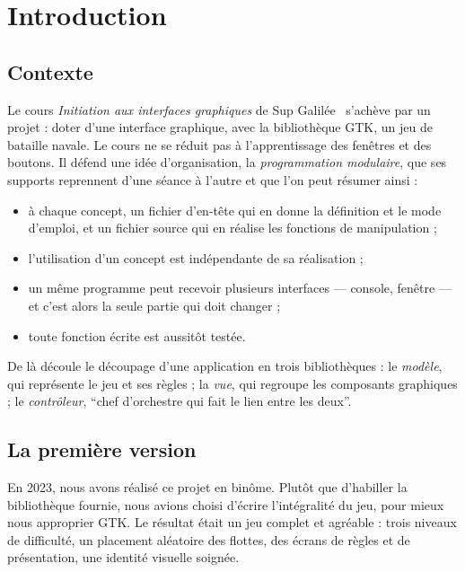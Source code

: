 \chapter{Introduction}
\label{chap-introduction}

\section{Contexte}

Le cours \emph{Initiation aux interfaces graphiques} de Sup Galilée~\cite{toulouse2023}
s'achève par un projet : doter d'une interface graphique, avec la bibliothèque GTK, un jeu
de bataille navale. Le cours ne se réduit pas à l'apprentissage des fenêtres et des boutons.
Il défend une idée d'organisation, la \emph{programmation modulaire}, que ses supports
reprennent d'une séance à l'autre et que l'on peut résumer ainsi :

\begin{itemize}
  \item à chaque concept, un fichier d'en-tête qui en donne la définition et le mode
        d'emploi, et un fichier source qui en réalise les fonctions de manipulation ;
  \item l'utilisation d'un concept est indépendante de sa réalisation ;
  \item un même programme peut recevoir plusieurs interfaces --- console, fenêtre --- et
        c'est alors la seule partie qui doit changer ;
  \item toute fonction écrite est aussitôt testée.
\end{itemize}

De là découle le découpage d'une application en trois bibliothèques : le \emph{modèle}, qui
représente le jeu et ses règles ; la \emph{vue}, qui regroupe les composants graphiques ;
le \emph{contrôleur}, \enquote{chef d'orchestre qui fait le lien entre les deux}.

\section{La première version}

En 2023, nous avons réalisé ce projet en binôme. Plutôt que d'habiller la bibliothèque
fournie, nous avions choisi d'écrire l'intégralité du jeu, pour mieux nous approprier GTK.
Le résultat était un jeu complet et agréable : trois niveaux de difficulté, un placement
aléatoire des flottes, des écrans de règles et de présentation, une identité visuelle
soignée.

